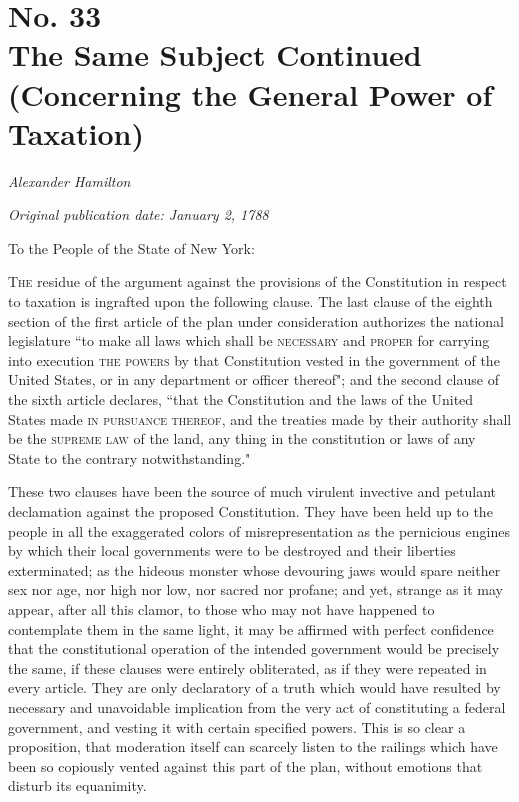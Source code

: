 \chapter[No. 33: The Same Subject Continued (Concerning the General Power of Taxation)]{No. 33\\ {\small The Same Subject Continued (Concerning the General Power of Taxation)}}

\textit{Alexander Hamilton}

\textit{Original publication date: January 2, 1788}
\vspace{1cm}

To the People of the State of New York:
\vspace{.4cm}

\textsc{The} residue of the argument against the provisions of the Constitution in respect to taxation is ingrafted upon the following clause. 
The last clause of the eighth section of the first article of the plan under consideration authorizes the national legislature ``to make all laws which shall be \textsc{necessary} and \textsc{proper} for carrying into execution \textsc{the powers} by that Constitution vested in the government of the United States, or in any department or officer thereof"; and the second clause of the sixth article declares, ``that the Constitution and the laws of the United States made \textsc{in pursuance thereof}, and the treaties made by their authority shall be the \textsc{supreme law} of the land, any thing in the constitution or laws of any State to the contrary notwithstanding."

These two clauses have been the source of much virulent invective and petulant declamation against the proposed Constitution. 
They have been held up to the people in all the exaggerated colors of misrepresentation as the pernicious engines by which their local governments were to be destroyed and their liberties exterminated; as the hideous monster whose devouring jaws would spare neither sex nor age, nor high nor low, nor sacred nor profane; and yet, strange as it may appear, after all this clamor, to those who may not have happened to contemplate them in the same light, it may be affirmed with perfect confidence that the constitutional operation of the intended government would be precisely the same, if these clauses were entirely obliterated, as if they were repeated in every article. 
They are only declaratory of a truth which would have resulted by necessary and unavoidable implication from the very act of constituting a federal government, and vesting it with certain specified powers. 
This is so clear a proposition, that moderation itself can scarcely listen to the railings which have been so copiously vented against this part of the plan, without emotions that disturb its equanimity.

